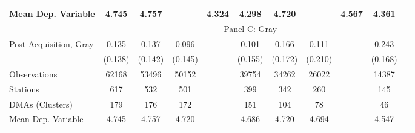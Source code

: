 {\begin{tabular}{l*{10}{c}}
Mean Dep. Variable&    4.745   &    4.757   &         &    4.324   &    4.298   &    4.720   &         &    4.567   &    4.361   \\
\midrule \ & \multicolumn{9}{c}{Panel C: Gray} \\\cmidrule(lr){2-10}
Post-Acquisition, Gray&    0.135   &    0.137   &    0.096   &         &    0.101   &    0.166   &    0.111   &         &    0.243   \\
                &  (0.138)   &  (0.142)   &  (0.145)   &         &  (0.155)   &  (0.172)   &  (0.210)   &         &  (0.168)   \\
\midrule
Observations    &    62168   &    53496   &    50152   &         &    39754   &    34262   &    26022   &         &    14387   \\
Stations        &      617   &      532   &      501   &         &      399   &      342   &      260   &         &      145   \\
DMAs (Clusters) &      179   &      176   &      172   &         &      151   &      104   &       78   &         &       46   \\
Mean Dep. Variable&    4.745   &    4.757   &    4.720   &         &    4.686   &    4.720   &    4.694   &         &    4.547   \\
\bottomrule \end{tabular}}
